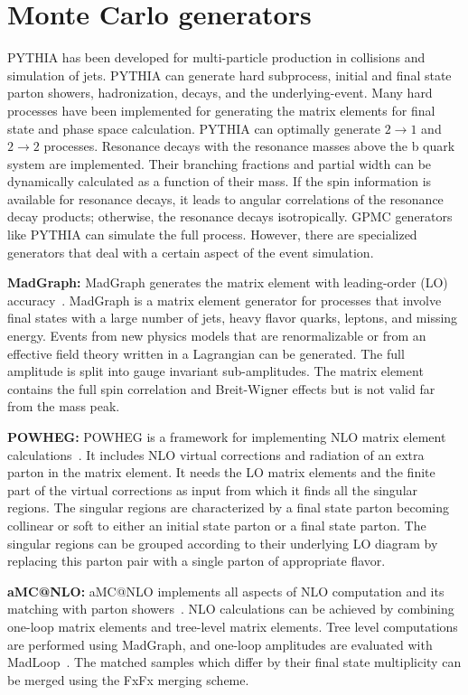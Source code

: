 \section{Monte Carlo generators}

PYTHIA has been developed for multi-particle production in \pp collisions and simulation of jets. PYTHIA can generate hard subprocess, initial and final state parton showers, hadronization, decays, and the underlying-event. Many hard processes have been implemented for generating the matrix elements for final state and phase space calculation. PYTHIA can optimally generate $2 \to 1$ and $2 \to 2$ processes. Resonance decays with the resonance masses above the b quark system are implemented. Their branching fractions and partial width can be dynamically calculated as a function of their mass. If the spin information is available for resonance decays, it leads to angular correlations of the resonance decay products; otherwise, the resonance decays isotropically. GPMC generators like PYTHIA can simulate the full process. However, there are specialized generators that deal with a certain aspect of the event simulation.

\textbf{MadGraph:} MadGraph generates the matrix element with leading-order (LO) accuracy~\cite{Alwall:2011uj}. MadGraph is a matrix element generator for processes that involve final states with a large number of jets, heavy flavor quarks, leptons, and missing energy. Events from new physics models that are renormalizable or from an effective field theory written in a Lagrangian can be generated. The full amplitude is split into gauge invariant sub-amplitudes. The matrix element contains the full spin correlation and Breit-Wigner effects but is not valid far from the mass peak.

\textbf{POWHEG:} POWHEG is a framework for implementing NLO matrix element calculations~\cite{Alioli:2010xd}. It includes NLO virtual corrections and radiation of an extra parton in the matrix element. It needs the LO matrix elements and the finite part of the virtual corrections as input from which it finds all the singular regions. The singular regions are characterized by a final state parton becoming collinear or soft to either an initial state parton or a final state parton. The singular regions can be grouped according to their underlying LO diagram by replacing this parton pair with a single parton of appropriate flavor.

\textbf{aMC@NLO:} aMC@NLO implements all aspects of NLO computation and its matching with parton showers~\cite{Frederix:2011ss, Alwall:2014hca}. NLO calculations can be achieved by combining one-loop matrix elements and tree-level matrix elements. Tree level computations are performed using MadGraph, and one-loop amplitudes are evaluated with MadLoop~\cite{Hirschi:2011pa}. The matched samples which differ by their final state multiplicity can be merged using the FxFx merging scheme.


